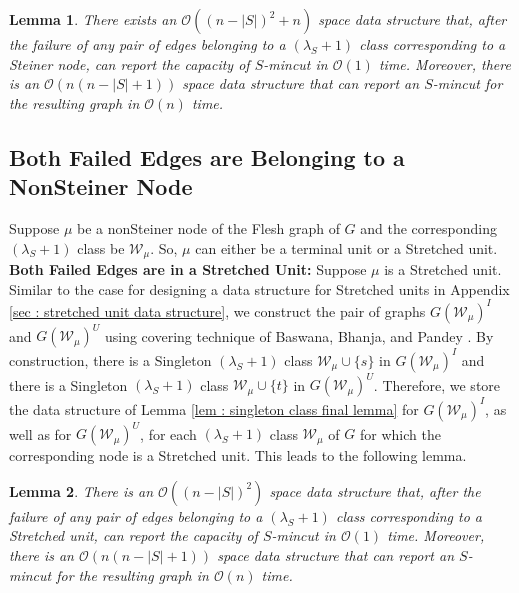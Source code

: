 \documentclass[letterpaper,11pt]{article}
\newtheorem{lemma}{Lemma}[]
\begin{document}
\begin{lemma} \label{lem : generic Steiner node dual edge failure}
    There exists an ${\mathcal O}((n-|S|)^2+n)$ space data structure that, after the failure of any pair of edges belonging to a $(\lambda_S+1)$ class corresponding to a Steiner node, can report the capacity of $S$-mincut in ${\mathcal O}(1)$ time. Moreover, there is an ${\mathcal O}(n(n-|S|+1))$ space data structure that can report an $S$-mincut for the resulting graph in ${\mathcal O}(n)$ time.
\end{lemma}
















\subsection{Both Failed Edges are Belonging to a NonSteiner Node} \label{sec : nonSteiner node}
 Suppose $\mu$ be a nonSteiner node of the Flesh graph of $G$ and the corresponding $(\lambda_S+1)$ class be ${\mathcal W}_{\mu}$. So, $\mu$ can either be a terminal unit or a Stretched unit. \\


\noindent
\textbf{Both Failed Edges are in a Stretched Unit:} Suppose $\mu$ is a Stretched unit. Similar to the case for designing a data structure for Stretched units in Appendix \ref{sec : stretched unit data structure}, we construct the pair of graphs $G({\mathcal W}_{\mu})^I$ and $G({\mathcal W}_{\mu})^U$ using covering technique of Baswana, Bhanja, and Pandey \cite{DBLP:journals/talg/BaswanaBP23}. By construction, there is a Singleton $(\lambda_S+1)$ class ${\mathcal W}_{\mu}\cup \{s\}$ in $G({\mathcal W}_{\mu})^I$ and there is a Singleton $(\lambda_S+1)$ class ${\mathcal W}_{\mu}\cup \{t\}$ in $G({\mathcal W}_{\mu})^U$. Therefore, we store the data structure of Lemma \ref{lem : singleton class final lemma} for $G({\mathcal W}_{\mu})^I$, as well as for $G({\mathcal W}_{\mu})^U$, for each $(\lambda_S+1)$ class ${\mathcal W}_{\mu}$ of $G$ for which the corresponding node is a Stretched unit. This leads to the following lemma.
\begin{lemma} \label{lem : stretched unit}
    There is an ${\mathcal O}((n-|S|)^2)$ space data structure that, after the failure of any pair of edges belonging to a $(\lambda_S+1)$ class corresponding to a Stretched unit, can report the capacity of $S$-mincut in ${\mathcal O}(1)$ time. Moreover, there is an ${\mathcal O}(n(n-|S|+1))$ space data structure that can report an $S$-mincut for the resulting graph in ${\mathcal O}(n)$ time.
\end{lemma}
 
\end{document}
